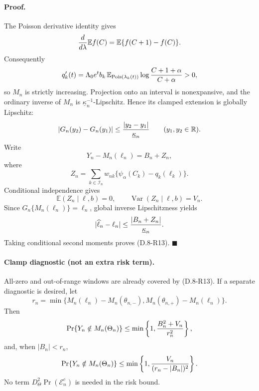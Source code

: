 \paragraph{Proof.}
The Poisson derivative identity gives
\[
 {d\over d\lambda}\mathbb E f(C)
 =\mathbb E\{f(C+1)-f(C)\}.
\]
Consequently
\[
 q_k'(t)=\Lambda_0e^tb_k\,
   \mathbb E_{\operatorname{Pois}(\lambda_k(t))}
   \log{C+1+\alpha\over C+\alpha}>0,
\]
so $M_n$ is strictly increasing.  Projection onto an interval is
nonexpansive, and the ordinary inverse of $M_n$ is
$\underline\kappa_n^{-1}$-Lipschitz.  Hence its clamped extension is
globally Lipschitz:
\[
 |G_n(y_2)-G_n(y_1)|
 \le {|y_2-y_1|\over\underline\kappa_n}
 \qquad(y_1,y_2\in\mathbb R).
\]
Write
\[
 Y_n-M_n(\ell_n)=B_n+Z_n,
\]
where
\[
 Z_n=\sum_{k\in\mathcal I_n}w_{nk}
 \{\psi_\alpha(C_k)-q_k(\ell_k)\}.
\]
Conditional independence gives
\[
 \mathbb E(Z_n\mid\ell,b)=0,\qquad
 \operatorname{Var}(Z_n\mid\ell,b)=V_n.
\]
Since $G_n\{M_n(\ell_n)\}=\ell_n$, global inverse Lipschitzness yields
\[
 |\widehat\ell_n-\ell_n|
 \le {|B_n+Z_n|\over\underline\kappa_n}.
\]
Taking conditional second moments proves (D.8-R13).
\hfill$\blacksquare$

\paragraph{Clamp diagnostic (not an extra risk term).}
All-zero and out-of-range windows are already covered by
(D.8-R13).  If a separate diagnostic is desired, let
\[
 r_n=\min\{M_n(\ell_n)-M_n(\theta_{n,-}),
           M_n(\theta_{n,+})-M_n(\ell_n)\}.
\]
Then
\[
 \Pr\{Y_n\notin M_n(\Theta_n)\}
 \le\min\left\{1,{B_n^2+V_n\over r_n^2}\right\},
\]
and, when $|B_n|<r_n$,
\[
 \Pr\{Y_n\notin M_n(\Theta_n)\}
 \le\min\left\{1,{V_n\over(r_n-|B_n|)^2}\right\}.
\]
No term $D_\Theta^2\Pr(\mathcal E_n^c)$ is needed in the risk bound.

